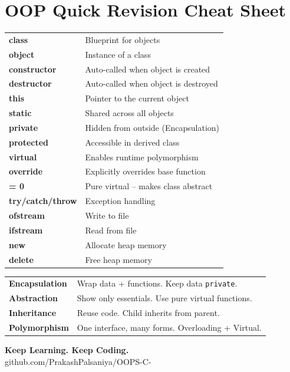 \documentclass[12pt,a4paper]{report}
\begin{document}
\newpage
\section{OOP Quick Revision Cheat Sheet}

\begin{tcolorbox}[colback=codebg, colframe=primary,
  title=\textbf{OOP in C++ -- Cheat Sheet},
  fonttitle=\bfseries\color{white}, coltitle=white]
\begin{tabular}{ll}
\textbf{class}           & Blueprint for objects \\
\textbf{object}          & Instance of a class \\
\textbf{constructor}     & Auto-called when object is created \\
\textbf{destructor}      & Auto-called when object is destroyed \\
\textbf{this}            & Pointer to the current object \\
\textbf{static}          & Shared across all objects \\
\textbf{private}         & Hidden from outside (Encapsulation) \\
\textbf{protected}       & Accessible in derived class \\
\textbf{virtual}         & Enables runtime polymorphism \\
\textbf{override}        & Explicitly overrides base function \\
\textbf{= 0}             & Pure virtual -- makes class abstract \\
\textbf{try/catch/throw} & Exception handling \\
\textbf{ofstream}        & Write to file \\
\textbf{ifstream}        & Read from file \\
\textbf{new}             & Allocate heap memory \\
\textbf{delete}          & Free heap memory \\
\end{tabular}
\end{tcolorbox}

\vspace{1cm}

\begin{tcolorbox}[colback=tipbg, colframe=tipframe,
  title=\textbf{4 Pillars of OOP}, fonttitle=\bfseries]
\begin{tabular}{lp{9cm}}
\textbf{Encapsulation}  & Wrap data + functions. Keep data \texttt{private}. \\
\textbf{Abstraction}    & Show only essentials. Use pure virtual functions. \\
\textbf{Inheritance}    & Reuse code. Child inherits from parent. \\
\textbf{Polymorphism}   & One interface, many forms. Overloading + Virtual. \\
\end{tabular}
\end{tcolorbox}

\vfill
\begin{center}
{\large\bfseries\color{primary} Keep Learning. Keep Coding.}\\[0.3cm]
{\color{lightgray} github.com/PrakashPalsaniya/OOPS-C-}
\end{center}
\end{document}
